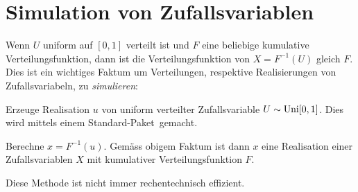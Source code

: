 \section{Simulation von Zufallsvariablen}
Wenn $U$ uniform auf $[0,1]$ verteilt ist und $F$ eine beliebige kumulative Verteilungsfunktion, dann ist die Verteilungsfunktion von $X=F^{-1}(U)$ gleich $F$. Dies ist ein wichtiges Faktum um Verteilungen, respektive Realisierungen von Zufallsvariabeln, zu \emph{simulieren}:
\begin{compactenum}[1.]
	\item Erzeuge Realisation $u$ von uniform verteilter Zufallsvariable $U\sim\operatorname{Uni}[0,1]$. Dies wird mittels einem \glqq Standard-Paket\grqq\ gemacht.
	\item Berechne $x=F^{-1}(u)$. Gemäss obigem Faktum ist dann $x$ eine Realisation einer Zufallsvariablen $X$ mit kumulativer Verteilungsfunktion $F$.
\end{compactenum}
Diese Methode ist nicht immer rechentechnisch effizient.
